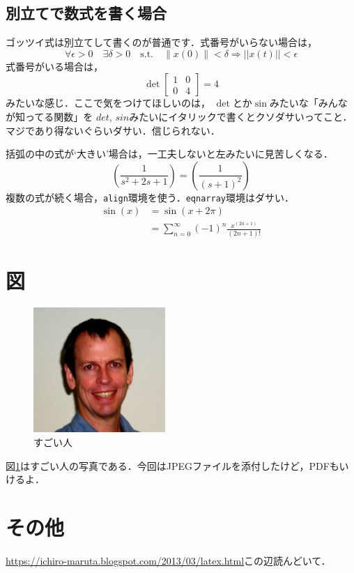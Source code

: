 \documentclass[a4j, uplatex, dvipdfmx]{jsarticle}
\begin{document}
  \subsection{別立てで数式を書く場合}
    ゴッツイ式は別立てして書くのが普通です．式番号がいらない場合は，
      \[
        \forall \epsilon > 0 \quad \exists \delta > 0 \quad
        \text{s.t.} \quad
          \|x(0)\| < \delta \Rightarrow ||x(t)|| < \epsilon
      \]
    式番号がいる場合は，
      \begin{equation}
        \operatorname{det}
          \begin{bmatrix}
            1 & 0 \\
            0 & 4
          \end{bmatrix} = 4
      \end{equation}
    みたいな感じ．ここで気をつけてほしいのは，
    $\operatorname{det}$とか$\sin$みたいな「みんなが知ってる関数」を
    $det$, $sin$みたいにイタリックで書くとクソダサいってこと．
    マジであり得ないぐらいダサい．信じられない．
    \par 括弧の中の式が`大きい'場合は，一工夫しないと左みたいに見苦しくなる．
      \begin{equation}
        (\frac{1}{s^2 + 2s + 1}) = \left(\frac{1}{(s + 1)^2} \right)
      \end{equation}
    複数の式が続く場合，\texttt{align}環境を使う．\texttt{eqnarray}環境はダサい．
      \begin{align}
        \sin(x) &= \sin(x + 2\pi) \\
        &= \sum_{n = 0}^{\infty} (-1)^{n}\frac{x^{(2n + 1)}}{(2n + 1)!}
      \end{align}
\section{図}
    \begin{figure}[tbp]
      \centering %
      \includegraphics[width = 5cm]{figure/doyle_photo.jpg}
      \caption{すごい人} \label{pht_doyle}
    \end{figure}
  図\ref{pht_doyle}はすごい人の写真である．今回はJPEGファイルを添付したけど，PDFもいけるよ．
\section{その他}
  \url{https://ichiro-maruta.blogspot.com/2013/03/latex.html}この辺読んどいて．
\end{document}
